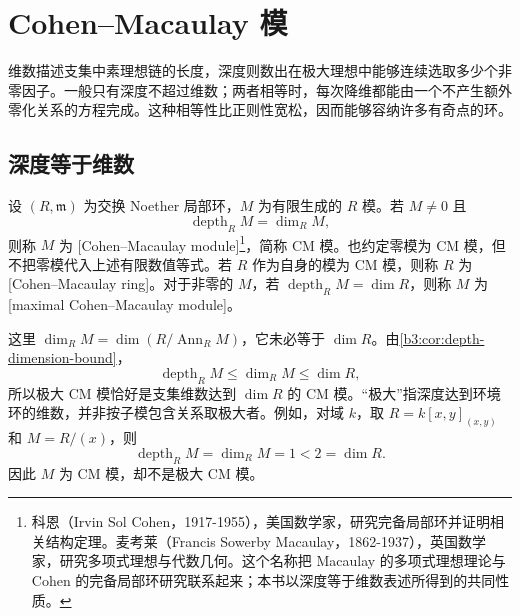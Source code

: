 
\section{Cohen–Macaulay 模}
\label{b3:sec:1901}

维数描述支集中素理想链的长度，深度则数出在极大理想中能够连续选取多少个非零因子。一般只有深度不超过维数；两者相等时，每次降维都能由一个不产生额外零化关系的方程完成。这种相等性比正则性宽松，因而能够容纳许多有奇点的环。


%
%

\subsection{深度等于维数}
\label{b3:subsec:1901:01}

\begin{definition}\label{b3:def:cohen-macaulay-module}
	设 \((R,\mathfrak m)\) 为交换 Noether 局部环，\(M\) 为有限生成的 \(R\) 模。若 \(M\ne0\) 且
	\[
		\operatorname{depth}_R M=\dim_R M,
	\]
	则称 \(M\) 为 [Cohen--Macaulay module]\footnote{科恩（Irvin Sol Cohen，1917-1955），美国数学家，研究完备局部环并证明相关结构定理。麦考莱（Francis Sowerby Macaulay，1862-1937），英国数学家，研究多项式理想与代数几何。这个名称把 Macaulay 的多项式理想理论与 Cohen 的完备局部环研究联系起来；本书以深度等于维数表述所得到的共同性质。}，简称 CM 模。也约定零模为 CM 模，但不把零模代入上述有限数值等式。若 \(R\) 作为自身的模为 CM 模，则称 \(R\) 为 [Cohen--Macaulay ring]。对于非零的 \(M\)，若 \(\operatorname{depth}_RM=\dim R\)，则称 \(M\) 为[maximal Cohen--Macaulay module]。
\end{definition}

这里 \(\dim_RM=\dim(R/\operatorname{Ann}_R M)\)，它未必等于 \(\dim R\)。由\cref{b3:cor:depth-dimension-bound}，
\[
	\operatorname{depth}_RM\le\dim_RM\le\dim R,
\]
所以极大 CM 模恰好是支集维数达到 \(\dim R\) 的 CM 模。“极大”指深度达到环境环的维数，并非按子模包含关系取极大者。例如，对域 \(k\)，取 \(R=k[x,y]_{(x,y)}\) 和 \(M=R/(x)\)，则
\[
	\operatorname{depth}_RM=\dim_RM=1<2=\dim R.
\]
因此 \(M\) 为 CM 模，却不是极大 CM 模。

